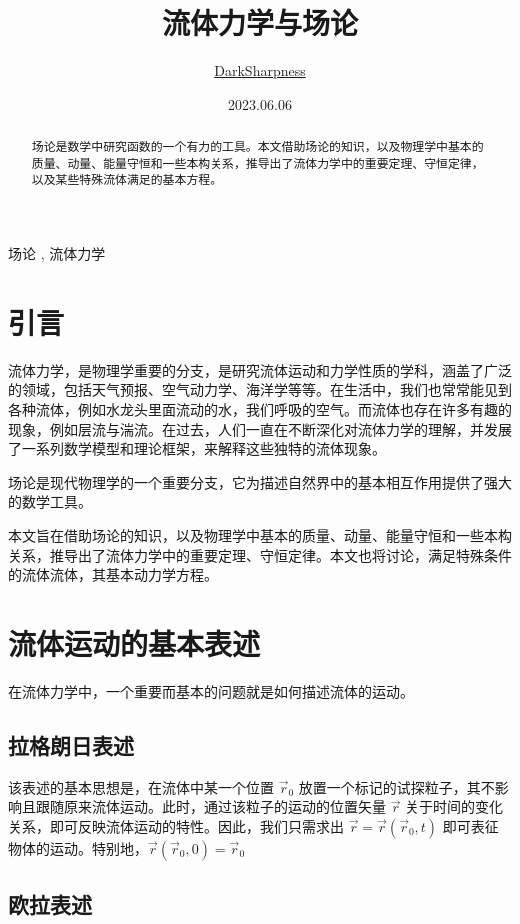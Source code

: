 \documentclass[fontset=windows]{article}
\title{\heiti\zihao{2} 流体力学与场论}
\author{\href{https://darksharpness.github.io/}{DarkSharpness}}
\date{2023.06.06}
\providecommand{\keywords}[1]
{
  \textbf{\text{Keywords: }} #1
}
\begin{document}
	\maketitle

\begin{abstract} 
    场论是数学中研究函数的一个有力的工具。本文借助场论的知识，以及物理学中基本的质量、动量、能量守恒和一些本构关系，推导出了流体力学中的重要定理、守恒定律，以及某些特殊流体满足的基本方程。
\end{abstract}

\keywords{ 场论 , 流体力学 }

\tableofcontents

\section{引言}

流体力学，是物理学重要的分支，是研究流体运动和力学性质的学科，涵盖了广泛的领域，包括天气预报、空气动力学、海洋学等等。在生活中，我们也常常能见到各种流体，例如水龙头里面流动的水，我们呼吸的空气。而流体也存在许多有趣的现象，例如层流与湍流。在过去，人们一直在不断深化对流体力学的理解，并发展了一系列数学模型和理论框架，来解释这些独特的流体现象。

场论是现代物理学的一个重要分支，它为描述自然界中的基本相互作用提供了强大的数学工具。

本文旨在借助场论的知识，以及物理学中基本的质量、动量、能量守恒和一些本构关系，推导出了流体力学中的重要定理、守恒定律。本文也将讨论，满足特殊条件的流体流体，其基本动力学方程。

\section{流体运动的基本表述}

在流体力学中，一个重要而基本的问题就是如何描述流体的运动。

\subsection{拉格朗日表述}

该表述的基本思想是，在流体中某一个位置 $\vec{r}_0$ 放置一个标记的试探粒子，其不影响且跟随原来流体运动。此时，通过该粒子的运动的位置矢量 $\vec{r}$ 关于时间的变化关系，即可反映流体运动的特性。因此，我们只需求出 $\vec{r} = \vec{r}(\vec{r}_0,t)$ 即可表征物体的运动。特别地，$\vec{r}(\vec{r}_0,0) = \vec{r}_0$

\subsection{欧拉表述}
\end{document}
